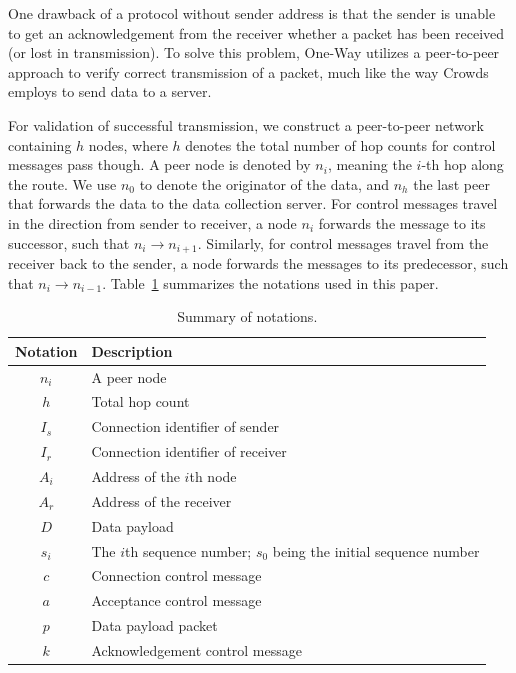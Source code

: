 One drawback of a protocol without sender address is that the
sender is unable to get an acknowledgement from the receiver
whether a packet has been received (or lost in transmission). To
solve this problem, One-Way utilizes a peer-to-peer approach to
verify correct transmission of a packet, much like the way
Crowds~\cite{DBLP:journals/tissec/ReiterR98} employs to send data
to a server.



For validation of successful transmission, we construct a
peer-to-peer network containing $h$ nodes, where $h$ denotes the
total number of hop counts for control messages pass though. A
peer node is denoted by $n_i$, meaning the $i$-th hop along the
route. We use $n_0$ to denote the originator of the data, and
$n_h$ the last peer that forwards the data to the data collection
server. For control messages travel in the direction from sender
to receiver, a node $n_i$ forwards the message to its successor,
such that $n_i \rightarrow n_{i+1}$. Similarly, for control
messages travel from the receiver back to the sender, a node
forwards the messages to its predecessor, such that $n_{i}
\rightarrow n_{i-1}$. Table~\ref{tab:notations} summarizes the
notations used in this paper.

\begin{table}[h]
\centering \caption{Summary of notations.} \label{tab:notations}
\begin{tabular}{|c|p{2.6in}|}
\hline
{\bf Notation} & {\bf Description}\\
\hline
$n_i$ & A peer node\\
$h$   & Total hop count\\
$I_s$ & Connection identifier of sender\\
$I_r$ & Connection identifier of receiver\\
$A_i$ & Address of the $i$th node\\
$A_r$ & Address of the receiver \\
$D$   & Data payload\\
$s_i$ & The $i$th sequence number; $s_0$ being the initial sequence number\\
$c$   & Connection control message\\
$a$   & Acceptance control message\\
$p$   & Data payload packet\\
$k$   & Acknowledgement control message\\
\hline
\end{tabular}
\end{table}

